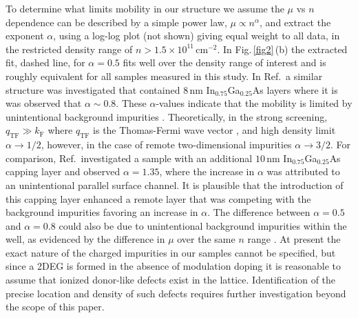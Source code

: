 \documentclass[
floatfix,
aps,
prl,
twocolumn,
superscriptaddress,
amssymb,
 groupaddress,
]{revtex4}
\begin{document}
To determine what limits mobility in our structure we assume the $\mu$ vs $n$ dependence can be described by a simple power law, $\mu\propto n^{\alpha}$, and extract the exponent $\alpha$, using a log-log plot (not shown) giving equal weight to all data, in the restricted density range of $n>1.5 \times 10^{11}\,$cm$^{-2}$.
In Fig.\,\ref{fig2}\,(b) the extracted fit, dashed line, for $\alpha = 0.5$ fits well over the density range of interest and is roughly equivalent for all samples measured in this study.
In Ref.\,\citep{shabani:2014_MIT} a similar structure was investigated that contained $8\,$nm In$_{0.75}$Ga$_{0.25}$As layers where it is was observed that $\alpha \sim 0.8$.
These $\alpha$-values indicate that the mobility is limited by unintentional background impurities \citep{sarma:2013}.
Theoretically, in the strong screening, $q_{\mathrm{TF}} \gg k_{\mathrm{F}}$ where $q_{\mathrm{TF}}$ is the Thomas-Fermi wave vector \citep{stern:1967}, and high density limit $\alpha \rightarrow 1/2$, however, in the case of remote two-dimensional impurities $\alpha \rightarrow 3/2$.
For comparison, Ref.\,\citep{shabani:2014_MIT} investigated a sample with an additional $10\,$nm In$_{0.75}$Ga$_{0.25}$As capping layer and observed $\alpha = 1.35$, where the increase in $\alpha$ was attributed to an unintentional parallel surface channel. 
It is plausible that the introduction of this capping layer enhanced a remote layer that was competing with the background impurities favoring an increase in $\alpha$.
The difference between $\alpha=0.5$ and $\alpha=0.8$ could also be due to unintentional background impurities within the well, as evidenced by the difference in $\mu$ over the same $n$ range \citep{sarma:2013}.
At present the exact nature of the charged impurities in our samples cannot be specified, but since a 2DEG is formed in the absence of modulation doping it is reasonable to assume that ionized donor-like defects exist in the lattice.  
Identification of the precise location and density of such defects requires further investigation beyond the scope of this paper.
\end{document}
